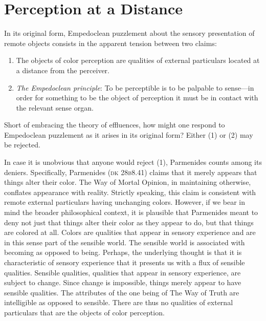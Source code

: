 \chapter{Perception at a Distance} %
\label{cha:perception_at_a_distance}

In its original form, Empedoclean puzzlement about the sensory presentation of remote objects consists in the apparent tension between two claims:
\begin{enumerate}[(1)]
    \item The objects of color perception are qualities of external particulars located at a distance from the perceiver.
    \item \emph{The Empedoclean principle}: To be perceptible is to be palpable to sense---in order for something to be the object of perception it must be in contact with the relevant sense organ.
\end{enumerate}
Short of embracing the theory of effluences, how might one respond to Empedoclean puzzlement as it arises in its original form? Either (1) or (2) may be rejected. 

In case it is unobvious that anyone would reject (1), Parmenides counts among its deniers. Specifically, Parmenides (\textsc{dk} 28\textsc{b}8.41) claims that it merely appears that things alter their color. The Way of Mortal Opinion, in maintaining otherwise, conflates appearance with reality. Strictly speaking, this claim is consistent with remote external particulars having unchanging colors. However, if we bear in mind the broader philosophical context, it is plausible that Parmenides meant to deny not just that things alter their color as they appear to do, but that things are colored at all. Colors are qualities that appear in sensory experience and are in this sense part of the sensible world. The sensible world is associated with becoming as opposed to being. Perhaps, the underlying thought is that it is characteristic of sensory experience that it presents us with a flux of sensible qualities. Sensible qualities, qualities that appear in sensory experience, are subject to change. Since change is impossible, things merely appear to have sensible qualities. The attributes of the one being of The Way of Truth are intelligible as opposed to sensible. There are thus no qualities of external particulars that are the objects of color perception. 

